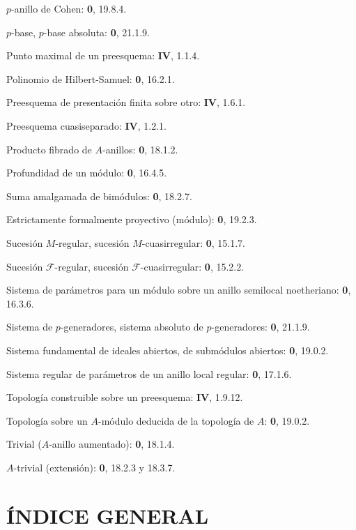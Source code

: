$p$-anillo de Cohen: \textbf{0}, 19.8.4.\par
$p$-base, $p$-base absoluta: \textbf{0}, 21.1.9.\par
Punto maximal de un preesquema: \textbf{IV}, 1.1.4.\par

\clearpage
{}
Polinomio de Hilbert-Samuel: \textbf{0}, 16.2.1.\par
Preesquema de presentación finita sobre otro: \textbf{IV}, 1.6.1.\par
Preesquema cuasiseparado: \textbf{IV}, 1.2.1.\par
Producto fibrado de $A$-anillos: \textbf{0}, 18.1.2.\par
Profundidad de un módulo: \textbf{0}, 16.4.5.\par

Suma amalgamada de bimódulos: \textbf{0}, 18.2.7.\par
Estrictamente formalmente proyectivo (módulo): \textbf{0}, 19.2.3.\par
Sucesión $M$-regular, sucesión $M$-cuasirregular: \textbf{0}, 15.1.7.\par
Sucesión $\mathscr F$-regular, sucesión $\mathscr F$-cuasirregular: \textbf{0}, 15.2.2.\par
Sistema de parámetros para un módulo sobre un anillo semilocal noetheriano: \textbf{0}, 16.3.6.\par
Sistema de $p$-generadores, sistema absoluto de $p$-generadores: \textbf{0}, 21.1.9.\par
Sistema fundamental de ideales abiertos, de submódulos abiertos: \textbf{0}, 19.0.2.\par
Sistema regular de parámetros de un anillo local regular: \textbf{0}, 17.1.6.\par

Topología construible sobre un preesquema: \textbf{IV}, 1.9.12.\par
Topología sobre un $A$-módulo deducida de la topología de $A$: \textbf{0}, 19.0.2.\par
Trivial ($A$-anillo aumentado): \textbf{0}, 18.1.4.\par
$A$-trivial (extensión): \textbf{0}, 18.2.3 y 18.3.7.\par

\clearpage
{}
{}
\section*{ÍNDICE GENERAL}


